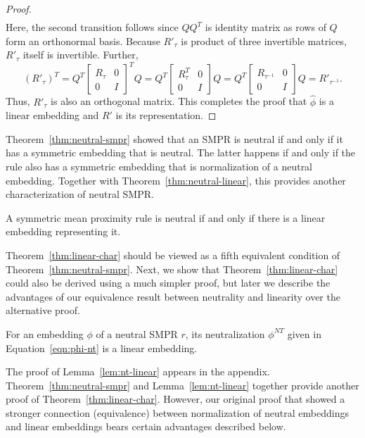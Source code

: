 \documentclass[prodmode,acmec]{ec-acmsmall}
\newcommand{\nt}{NT}
\begin{document}
\begin{proof}
\begin{align*}
\end{align*}
Here, the second transition follows since $Q Q^T$ is identity matrix as rows of $Q$ form an orthonormal basis. Because $R'_{\tau}$ is product of three invertible matrices, $R'_{\tau}$ itself is invertible. Further, 
$$
(R'_{\tau})^T = Q^T \left[ \begin{smallmatrix} R_{\tau} & 0 \\ 0 & I \end{smallmatrix} \right]^T Q = Q^T \left[ \begin{smallmatrix} R_{\tau}^T & 0 \\ 0 & I \end{smallmatrix} \right] Q = Q^T \left[ \begin{smallmatrix} R_{\tau^{-1}} & 0 \\ 0 & I \end{smallmatrix} \right] Q
 = R'_{\tau^{-1}}.
 $$
Thus, $R'_{\tau}$ is also an orthogonal matrix. This completes the proof that $\hat{\phi}$ is a linear embedding and $R'$ is its representation.
\end{proof}

Theorem~\ref{thm:neutral-smpr} showed that an SMPR is neutral if and only if it has a symmetric embedding that is neutral. The latter happens if and only if the rule also has a symmetric embedding that is normalization of a neutral embedding. Together with Theorem~\ref{thm:neutral-linear}, this provides another characterization of neutral SMPR. 

\begin{theorem}
A symmetric mean proximity rule is neutral if and only if there is a linear embedding representing it.
\label{thm:linear-char}
\end{theorem}

Theorem~\ref{thm:linear-char} should be viewed as a fifth equivalent condition of Theorem~\ref{thm:neutral-smpr}. Next, we show that Theorem~\ref{thm:linear-char} could also be derived using a much simpler proof, but later we describe the advantages of our equivalence result between neutrality and linearity over the alternative proof. 

\begin{lemma}
For an embedding $\phi$ of a neutral SMPR $r$, its neutralization $\phi^{\nt}$ given in Equation~\eqref{eqn:phi-nt} is a linear embedding.
\label{lem:nt-linear}
\end{lemma}

The proof of Lemma~\ref{lem:nt-linear} appears in the appendix. Theorem~\ref{thm:neutral-smpr} and Lemma~\ref{lem:nt-linear} together provide another proof of Theorem~\ref{thm:linear-char}. However, our original proof that showed a stronger connection (equivalence) between normalization of neutral embeddings and linear embeddings bears certain advantages described below.
\end{document}
